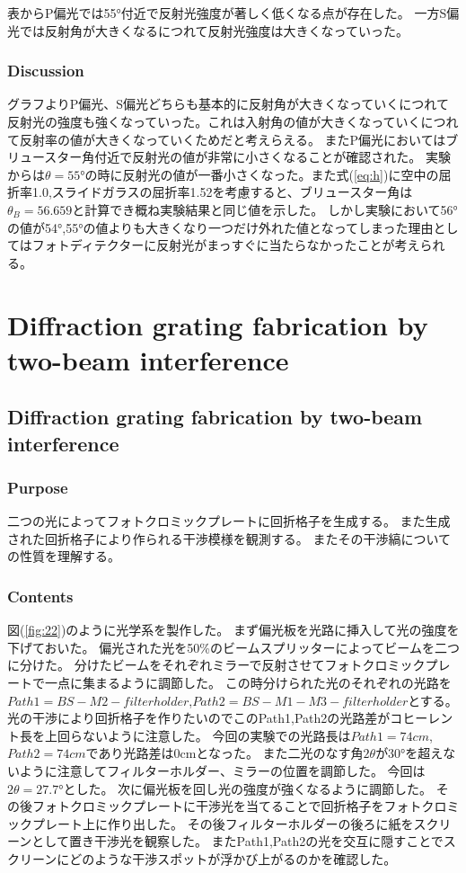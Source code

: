 \documentclass[11pt, a4paper]{jsarticle}
\begin{document}
表からP偏光では55°付近で反射光強度が著しく低くなる点が存在した。
一方S偏光では反射角が大きくなるにつれて反射光強度は大きくなっていった。

\newpage
\subsubsection{Discussion}
グラフよりP偏光、S偏光どちらも基本的に反射角が大きくなっていくにつれて反射光の強度も強くなっていった。これは入射角の値が大きくなっていくにつれて反射率の値が大きくなっていくためだと考えらえる。
またP偏光においてはブリュースター角付近で反射光の値が非常に小さくなることが確認された。
実験からは$\theta=55°$の時に反射光の値が一番小さくなった。また式(\ref{eq:h})に空中の屈折率1.0,スライドガラスの屈折率1.52を考慮すると、ブリュースター角は$\theta_B=56.659$と計算でき概ね実験結果と同じ値を示した。
しかし実験において56°の値が54°,55°の値よりも大きくなり一つだけ外れた値となってしまった理由としてはフォトディテクターに反射光がまっすぐに当たらなかったことが考えられる。
\section{Diffraction grating fabrication by two-beam interference}
\subsection{Diffraction grating fabrication by two-beam interference}
\subsubsection{Purpose}
二つの光によってフォトクロミックプレートに回折格子を生成する。
また生成された回折格子により作られる干渉模様を観測する。
またその干渉縞についての性質を理解する。
\subsubsection{Contents}
図(\ref{fig:22})のように光学系を製作した。
まず偏光板を光路に挿入して光の強度を下げておいた。
偏光された光を50\%のビームスプリッターによってビームを二つに分けた。
分けたビームをそれぞれミラーで反射させてフォトクロミックプレートで一点に集まるように調節した。
この時分けられた光のそれぞれの光路を$Path1=BS - M2 - filter holder$,$Path2=BS - M1 - M3 - filter holder$とする。
光の干渉により回折格子を作りたいのでこのPath1,Path2の光路差がコヒーレント長を上回らないように注意した。
今回の実験での光路長は$Path1=74cm$,$Path2=74cm$であり光路差は0cmとなった。
また二光のなす角$2\theta$が30°を超えないように注意してフィルターホルダー、ミラーの位置を調節した。
今回は$2\theta = 27.7°$とした。
次に偏光板を回し光の強度が強くなるように調節した。
その後フォトクロミックプレートに干渉光を当てることで回折格子をフォトクロミックプレート上に作り出した。
その後フィルターホルダーの後ろに紙をスクリーンとして置き干渉光を観察した。
またPath1,Path2の光を交互に隠すことでスクリーンにどのような干渉スポットが浮かび上がるのかを確認した。
\end{document}
